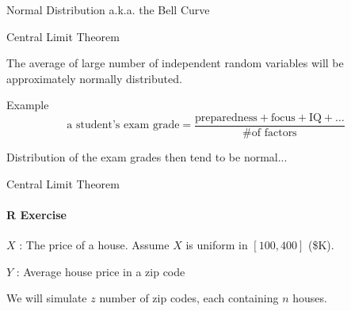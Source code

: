 \documentclass{beamer}\usepackage[]{graphicx}\usepackage[]{color}
\begin{document}
\begin{darkframes}
\begin{frame}[label=lists]{Normal Distribution a.k.a. the Bell Curve}
		
   			
	\end{frame}
	
	
	
	
	
	\begin{frame}[label=lists]{Central Limit Theorem}
		\begin{definition}
			The average of large number of independent random variables will be approximately normally distributed.
		\end{definition}		
		
		\begin{exampleblock}{Example}
			$$
				\text{a student's exam grade} = \frac{  \text{preparedness} + \text{focus} + \text{IQ} + \ldots  }{ \text{\# of factors}}
			$$
		\end{exampleblock}
		
		Distribution of the exam grades then tend to be normal...

   			
	\end{frame}	
	
	
	
	
	
	
	
	
	\begin{frame}[label=lists]{Central Limit Theorem}
		\framesubtitle{R Exercise} 
		 $X$ : The price of a house. Assume $X$ is uniform in $[100,400]$ (\$K).
		 
		 $Y$ : Average house price in a zip code
		 
		 We will simulate $z$ number of zip codes, each containing $n$ houses.		 	
		
		
		\housePrices
   			
	\end{frame}	










\end{darkframes}
  
  
  
\end{document}
